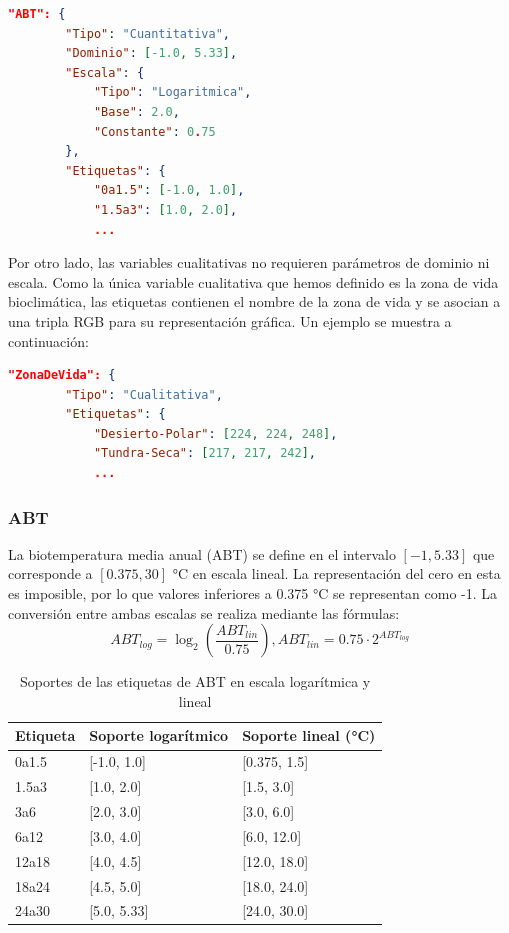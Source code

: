 \documentclass[11pt,a4paper]{article}
\begin{document}
\begin{lstlisting}[language=JSON, caption={Definición de variable lingüística cuantitativa ABT}, label={lst:json-app}]
"ABT": {
        "Tipo": "Cuantitativa",
        "Dominio": [-1.0, 5.33],
        "Escala": {
            "Tipo": "Logaritmica",
            "Base": 2.0,
            "Constante": 0.75
        },
        "Etiquetas": {
            "0a1.5": [-1.0, 1.0],
            "1.5a3": [1.0, 2.0],
            ...
\end{lstlisting}

Por otro lado, las variables cualitativas no requieren parámetros de dominio ni escala. Como la única variable
cualitativa que hemos definido es la zona de vida bioclimática, las etiquetas contienen el nombre de la zona de vida y
se asocian a una tripla RGB para su representación gráfica. Un ejemplo se muestra a continuación:

\begin{lstlisting}[language=JSON, caption={Definición de variable lingüística cualitativa Zona de Vida}, label={lst:json-zona-vida}]
"ZonaDeVida": {
        "Tipo": "Cualitativa",
        "Etiquetas": {
            "Desierto-Polar": [224, 224, 248],
            "Tundra-Seca": [217, 217, 242],
            ...
\end{lstlisting}

\clearpage

\subsubsection{ABT}

La biotemperatura media anual (ABT) se define en el intervalo \([-1, 5.33]\) que corresponde a \([0.375,30]\) °C en escala lineal.
La representación del cero en esta es imposible, por lo que valores inferiores a 0.375 °C se representan como -1.
La conversión entre ambas escalas se realiza mediante las fórmulas:
$$
    ABT_{log} = \log_{2}\left(\frac{ABT_{lin}}{0.75}\right), ABT_{lin} = 0.75 \cdot 2^{ABT_{log}}
$$

\begin{table}[H]
\centering
\caption{Soportes de las etiquetas de ABT en escala logarítmica y lineal}
\label{tab:abt-soportes}
\begin{tabular}{@{}lll@{}}
\toprule
Etiqueta & Soporte logarítmico & Soporte lineal (°C) \\
\midrule
0a1.5 & [-1.0, 1.0] & [0.375, 1.5] \\
1.5a3 & [1.0, 2.0] & [1.5, 3.0] \\
3a6 & [2.0, 3.0] & [3.0, 6.0] \\
6a12 & [3.0, 4.0] & [6.0, 12.0] \\
12a18 & [4.0, 4.5] & [12.0, 18.0] \\
18a24 & [4.5, 5.0] & [18.0, 24.0] \\
24a30 & [5.0, 5.33] & [24.0, 30.0] \\
\bottomrule
\end{tabular}
\end{table}
\end{document}
